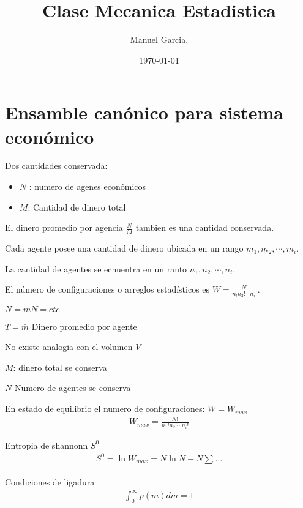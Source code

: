 \documentclass{article}
\title{Clase Mecanica Estadistica }
\author{Manuel Garcia.}
\date{\today}
\begin{document}
\maketitle

\section{Ensamble canónico para sistema económico }
Dos cantidades conservada: 
\begin{itemize}
  \item $ N  $ : numero de agenes económicos 
  
  \item $ M  $: Cantidad de dinero total
\end{itemize}
El dinero promedio por agencia $ \frac{N}{M}  $ tambien es una cantidad conservada.

Cada agente posee una cantidad de dinero ubicada en un rango $ m_1,m_2,\cdots,m_i  $.

La cantidad de agentes se ecnuentra en un ranto $ n_1,n_2,\cdots,n_i  $.

El número de configuraciones o arreglos estadísticos es $ W = \frac{N!}{n_!n_2!\cdots n_i! } $.

$ N = \bar m N = cte  $

$ T = \bar m  $ Dinero promedio por agente 

No existe analogia con el volumen $ V  $

$ M  $: dinero total se conserva 

$ N  $ Numero de agentes se conserva 

En estado de equilibrio el numero de configuraciones: $ W = W_{max } $
\begin{gather*}
  W_{max} = \frac{N! }{n_1!n_2! \cdots n_i!} 
\end{gather*}

\hfill 

\hfill 

Entropia de shannonn $ S^0  $ 
\begin{gather*}
  S^0 = \ln{W_{max }} = N \ln N - N \displaystyle\sum_{}^{} ...
\end{gather*}

Condiciones de ligadura 
\begin{gather}
  \displaystyle\int_{0 }^{\infty} p(m) dm = 1
\end{gather}
\end{document}
